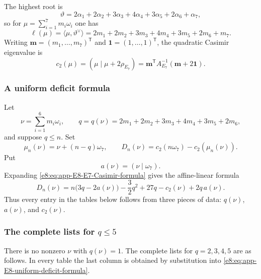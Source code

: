 \documentclass[11pt,reqno]{amsart}
\theoremstyle{definition}
\theoremstyle{remark}
\begin{document}
The highest root is
\begin{equation*}
 \vartheta
 =2\alpha_1+2\alpha_2+3\alpha_3+4\alpha_4
  +3\alpha_5+2\alpha_6+\alpha_7,
\end{equation*}
so for
$\mu=\sum_{i=1}^{7}m_i\omega_i$ one has
\begin{equation*}
 \ell(\mu)=\langle\mu,\vartheta^\vee\rangle
 =2m_1+2m_2+3m_3+4m_4+3m_5+2m_6+m_7.
\end{equation*}
Writing $\mathbf m=(m_1,\ldots,m_7)^{\mathsf T}$ and
$\mathbf 1=(1,\ldots,1)^{\mathsf T}$, the quadratic Casimir eigenvalue is
\begin{equation}
 c_2(\mu)
 =(\mu\mid\mu+2\rho_{E_7})
 =\mathbf m^{\mathsf T}A_{E_7}^{-1}
  (\mathbf m+2\mathbf 1).
 \label{e8:eq:app-E8-E7-Casimir-formula}
\end{equation}

\subsubsection{A uniform deficit formula}


Let
\begin{equation*}
 \nu=\sum_{i=1}^{6}m_i\omega_i,
 \qquad
 q=q(\nu)=2m_1+2m_2+3m_3+4m_4+3m_5+2m_6,
\end{equation*}
and suppose $q\le n$.  Set
\begin{equation*}
 \mu_n(\nu)=\nu+(n-q)\omega_7,
 \qquad
 D_n(\nu)=c_2(n\omega_7)-c_2(\mu_n(\nu)).
\end{equation*}
Put
\begin{equation*}
 a(\nu)=(\nu\mid\omega_7).
\end{equation*}
Expanding \eqref{e8:eq:app-E8-E7-Casimir-formula} gives the affine-linear
formula
\begin{equation}
 D_n(\nu)
 =n\bigl(3q-2a(\nu)\bigr)
  -\frac32q^2+27q-c_2(\nu)+2q\,a(\nu).
 \label{e8:eq:app-E8-uniform-deficit-formula}
\end{equation}
Thus every entry in the tables below follows from three pieces of data:
$q(\nu)$, $a(\nu)$, and $c_2(\nu)$.

\subsubsection{The complete lists for \texorpdfstring{$q\le5$}{q<=5}}


There is no nonzero $\nu$ with $q(\nu)=1$.  The complete lists for
$q=2,3,4,5$ are as follows.  In every table the last column is obtained by
substitution into \eqref{e8:eq:app-E8-uniform-deficit-formula}.
\end{document}
